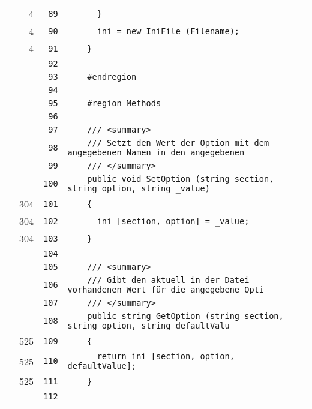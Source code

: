 \documentclass[a4paper,10pt]{article}
\begin{document}
\begin{longtable}[l]{lrrl}
\cellcolor{green} & 4 & \verb~89~ & \verb~      }~\\
\cellcolor{green} & 4 & \verb~90~ & \verb~      ini = new IniFile (Filename);~\\
\cellcolor{green} & 4 & \verb~91~ & \verb~    }~\\
\cellcolor{gray} &  & \verb~92~ & \verb~~\\
\cellcolor{gray} &  & \verb~93~ & \verb~    #endregion~\\
\cellcolor{gray} &  & \verb~94~ & \verb~~\\
\cellcolor{gray} &  & \verb~95~ & \verb~    #region Methods~\\
\cellcolor{gray} &  & \verb~96~ & \verb~~\\
\cellcolor{gray} &  & \verb~97~ & \verb~    /// <summary>~\\
\cellcolor{gray} &  & \verb~98~ & \verb~    /// Setzt den Wert der Option mit dem angegebenen Namen in den angegebenen~\\
\cellcolor{gray} &  & \verb~99~ & \verb~    /// </summary>~\\
\cellcolor{gray} &  & \verb~100~ & \verb~    public void SetOption (string section, string option, string _value)~\\
\cellcolor{green} & 304 & \verb~101~ & \verb~    {~\\
\cellcolor{green} & 304 & \verb~102~ & \verb~      ini [section, option] = _value;~\\
\cellcolor{green} & 304 & \verb~103~ & \verb~    }~\\
\cellcolor{gray} &  & \verb~104~ & \verb~~\\
\cellcolor{gray} &  & \verb~105~ & \verb~    /// <summary>~\\
\cellcolor{gray} &  & \verb~106~ & \verb~    /// Gibt den aktuell in der Datei vorhandenen Wert für die angegebene Opti~\\
\cellcolor{gray} &  & \verb~107~ & \verb~    /// </summary>~\\
\cellcolor{gray} &  & \verb~108~ & \verb~    public string GetOption (string section, string option, string defaultValu~\\
\cellcolor{green} & 525 & \verb~109~ & \verb~    {~\\
\cellcolor{green} & 525 & \verb~110~ & \verb~      return ini [section, option, defaultValue];~\\
\cellcolor{green} & 525 & \verb~111~ & \verb~    }~\\
\cellcolor{gray} &  & \verb~112~ & \verb~~\\

\end{longtable}
\end{document}
